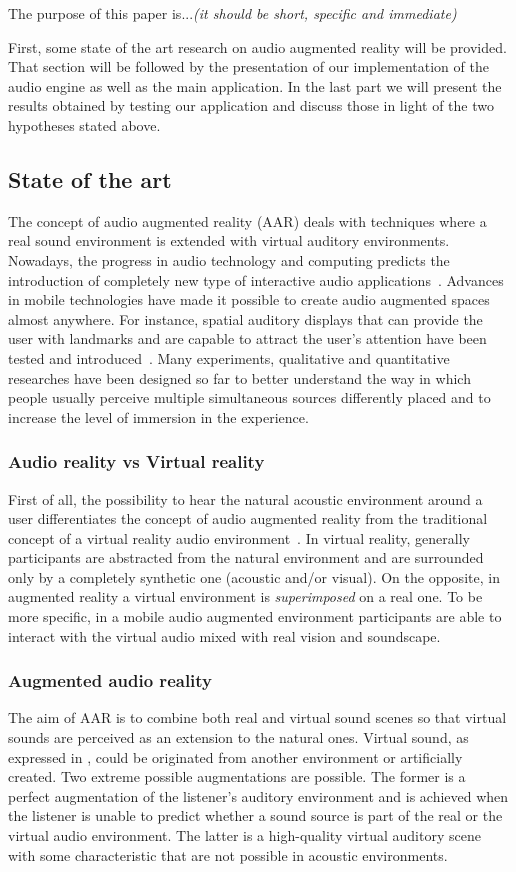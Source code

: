 \documentclass[journal]{IEEEtran}
\begin{document}
The purpose of this paper is...\textit{(it should be short, specific and immediate)}

First, some state of the art research on audio augmented reality will be provided. That section will be followed by the presentation of our implementation of the audio engine as well as the main application. In the last part we will present the results obtained by testing our application and discuss those in light of the two hypotheses stated above.



\subsection{State of the art}
The concept of audio augmented reality (AAR) deals with techniques where a real sound environment is extended with virtual auditory environments. Nowadays, the progress in audio technology and computing predicts the introduction of completely new type of interactive audio applications~\cite{}. Advances in mobile technologies have made it possible to create audio augmented spaces almost anywhere. For instance, spatial auditory displays that can provide the user with landmarks and are capable to attract the user's attention have been tested and introduced~\cite{}. Many experiments, qualitative and quantitative researches have been designed so far to better understand the way in which people usually perceive multiple simultaneous sources differently placed and to increase the level of immersion in the experience.

\subsubsection{Audio reality vs Virtual reality}
First of all, the possibility to hear the natural acoustic environment around a user differentiates the concept of audio augmented reality from the traditional concept of a virtual reality audio environment~\cite{}. In virtual reality, generally participants are abstracted from the natural environment and are surrounded only by a completely synthetic one (acoustic and/or visual). On the opposite, in augmented reality a virtual environment is \emph{superimposed} on a real one. To be more specific, in a mobile audio augmented environment participants are able to interact with the virtual audio mixed with real vision and soundscape.

\subsubsection{Augmented audio reality}
The aim of AAR is to combine both real and virtual sound scenes so that virtual sounds are perceived as an extension to the natural ones. Virtual sound, as expressed in \cite{}, could be originated from another environment or artificially created. Two extreme possible augmentations are possible. The former is a perfect augmentation of the listener's auditory environment and is achieved when the listener is unable to predict whether a sound source is part of the real or the virtual audio environment. The latter is a high-quality virtual auditory scene with some characteristic that are not possible in acoustic environments.
\end{document}
